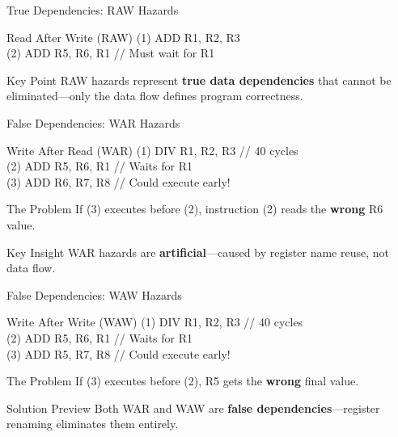\documentclass[aspectratio=169,12pt]{beamer}
\begin{document}
\begin{frame}{True Dependencies: RAW Hazards}
    \begin{exampleblock}{Read After Write (RAW)}
        {\ttfamily\footnotesize
        (1) ADD R1, R2, R3\\
        (2) ADD R5, R6, R1  // Must wait for R1
        }
    \end{exampleblock}
    
    \begin{alertblock}{Key Point}
        RAW hazards represent \textbf{true data dependencies} that cannot be eliminated—only the data flow defines program correctness.
    \end{alertblock}
\end{frame}

\begin{frame}{False Dependencies: WAR Hazards}
    \begin{exampleblock}{Write After Read (WAR)}
        {\ttfamily\footnotesize
        (1) DIV R1, R2, R3  // 40 cycles\\
        (2) ADD R5, R6, R1  // Waits for R1\\
        (3) ADD R6, R7, R8  // Could execute early!
        }
    \end{exampleblock}
    
    \begin{block}{The Problem}
        If (3) executes before (2), instruction (2) reads the \textbf{wrong} R6 value.
    \end{block}
    
    \begin{alertblock}{Key Insight}
        WAR hazards are \textbf{artificial}—caused by register name reuse, not data flow.
    \end{alertblock}
\end{frame}

\begin{frame}{False Dependencies: WAW Hazards}
    \begin{exampleblock}{Write After Write (WAW)}
        {\ttfamily\footnotesize
        (1) DIV R1, R2, R3  // 40 cycles\\
        (2) ADD R5, R6, R1  // Waits for R1\\
        (3) ADD R5, R7, R8  // Could execute early!
        }
    \end{exampleblock}
    
    \begin{block}{The Problem}
        If (3) executes before (2), R5 gets the \textbf{wrong} final value.
    \end{block}
    
    \begin{alertblock}{Solution Preview}
        Both WAR and WAW are \textbf{false dependencies}—register renaming eliminates them entirely.
    \end{alertblock}
\end{frame}
\end{document}

